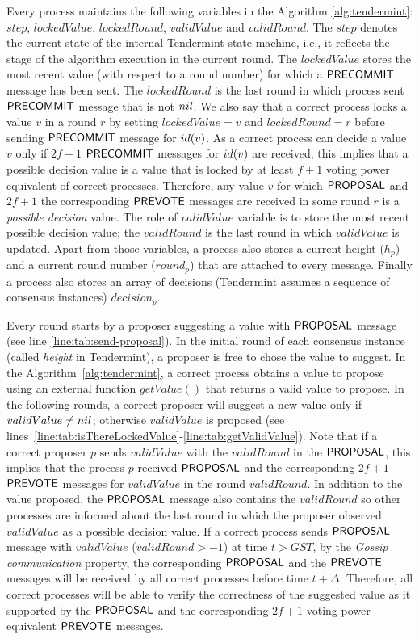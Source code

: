 Every process maintains the following variables in the Algorithm \ref{alg:tendermint}: $step$, $lockedValue$, $lockedRound$, $validValue$ and $validRound$. The $step$ denotes the current state of the internal Tendermint state machine, i.e., it reflects the stage of the algorithm execution in the current round. The $lockedValue$ stores the most recent value (with respect to a round number) for which a $\mathsf{PRECOMMIT}$ message has been sent. The $lockedRound$ is the last round in which process sent $\mathsf{PRECOMMIT}$ message that is not $nil$. We also say that a correct process locks a value $v$ in a round $r$ by setting $lockedValue = v$ and $lockedRound = r$ before sending $\mathsf{PRECOMMIT}$ message for $id(v)$. As a correct process can decide a value $v$ only if $2f+1$ $\mathsf{PRECOMMIT}$ messages for $id(v)$ are received, this implies that a possible decision value is a value that is locked by at least $f+1$ voting power equivalent of correct processes. Therefore, any value $v$ for which $\mathsf{PROPOSAL}$ and $2f+1$ the corresponding $\mathsf{PREVOTE}$ messages are received in some round $r$ is a \emph{possible decision} value. The role of $validValue$ variable is to store the most recent possible decision value; the $validRound$ is the last round in which $validValue$ is updated. Apart from those variables, a process also stores a current height ($h_p$) and a current round number ($round_p$) that are attached to every message. Finally a process also stores an array of decisions (Tendermint assumes a sequence of consensus instances) $decision_p$. 

Every round starts by a proposer suggesting a value with $\mathsf{PROPOSAL}$ message (see line \ref{line:tab:send-proposal}). In the initial round of each consensus instance (called \emph{height} in Tendermint), a proposer is free to chose the value to suggest. In the Algorithm~\ref{alg:tendermint}, a correct process obtains a value to propose using an external function    
$getValue()$ that returns a valid value to propose. In the following rounds, a correct proposer will suggest a new value only if $validValue \neq nil$; otherwise $validValue$ is proposed (see lines~\ref{line:tab:isThereLockedValue}-\ref{line:tab:getValidValue}). Note that if a correct proposer $p$ sends $validValue$ with the $validRound$ in the $\mathsf{PROPOSAL}$, this implies that the process $p$ received $\mathsf{PROPOSAL}$ and the corresponding $2f+1$ $\mathsf{PREVOTE}$ messages for $validValue$ in the round $validRound$. In addition to the value proposed, the $\mathsf{PROPOSAL}$ message also contains the $validRound$ so other processes are informed about the last round in which the proposer observed $validValue$ as a possible decision value.  
If a correct process sends $\mathsf{PROPOSAL}$ message with $validValue$ ($validRound > -1$) at time $t > GST$, by the \emph{Gossip communication} property, the corresponding $\mathsf{PROPOSAL}$ and the $\mathsf{PREVOTE}$ messages will be received by all correct processes before time $t+\Delta$. Therefore, all correct processes will be able to verify the correctness of the suggested value as it supported by the $\mathsf{PROPOSAL}$ and the corresponding $2f+1$ voting power equivalent $\mathsf{PREVOTE}$ messages.   

